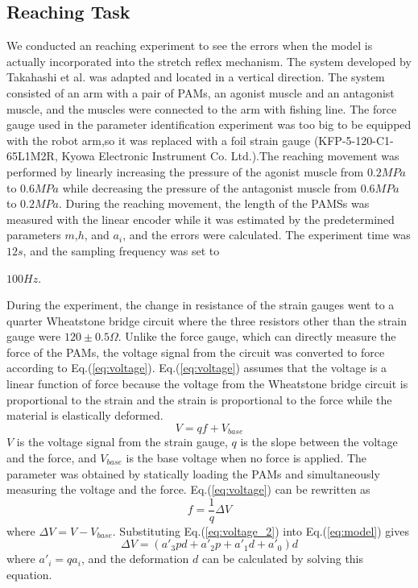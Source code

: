 \subsection{Reaching Task}
We conducted an reaching experiment to see the errors when the model is actually incorporated into the stretch reflex mechanism. The system developed by Takahashi et al.\cite{takahashi} was adapted and located in a vertical direction. The system consisted of an arm with a pair of PAMs, an agonist muscle and an antagonist muscle, and the muscles were connected to the arm with fishing line. The force gauge used in the parameter identification experiment was too big to be equipped with the robot arm,so it was replaced with a foil strain gauge (KFP-5-120-C1-65L1M2R, Kyowa Electronic Instrument Co. Ltd.).The reaching movement was performed by linearly increasing the pressure of the agonist muscle from $0.2 \si{MPa}$ to $0.6 \si{MPa}$ while decreasing the pressure of the antagonist muscle from $0.6 \si{MPa}$ to $0.2 \si{MPa}$. During the reaching movement, the length of the PAMSs was measured with the linear encoder while it was estimated by the predetermined parameters $m$,$h$, and $a_i$, and the errors were calculated. The experiment time was $12 \si{s}$, and the sampling frequency was set to 




$100 \si{Hz}$.

During the experiment, the change in resistance of the strain gauges went to a quarter Wheatstone bridge circuit where the three resistors other than the strain gauge were $120 \pm 0.5 \Omega$. Unlike the force gauge, which can directly measure the force of the PAMs, the voltage signal from the circuit was converted to force according to Eq.(\ref{eq:voltage}). Eq.(\ref{eq:voltage}) assumes that the voltage is a linear function of force because the voltage from the Wheatstone bridge circuit is proportional to the strain\cite{wheatstone} and the strain is proportional to the force while the material is elastically deformed.
\begin{equation}
    \label{eq:voltage}
    V=qf+V_{base}
\end{equation}
$V$ is the voltage signal from the strain gauge, $q$ is the slope between the voltage and the force, and $V_{base}$ is the base voltage when no force is applied.
The parameter was obtained by statically loading the PAMs and simultaneously measuring the voltage and the force.
Eq.(\ref{eq:voltage}) can be rewritten as 
\begin{equation}
    \label{eq:voltage_2}
    f = \frac{1}{q}\Delta V
\end{equation}
where $\Delta V = V - V_{base}$. Substituting Eq.(\ref{eq:voltage_2}) into Eq.(\ref{eq:model}) gives
\begin{equation}
    \label{eq:model_voltage}
    \Delta V = (a'_3pd + a'_2p + a'_1d + a'_0)d
\end{equation}
where $a'_i=qa_i$, and the deformation $d$ can be calculated by solving this equation.

